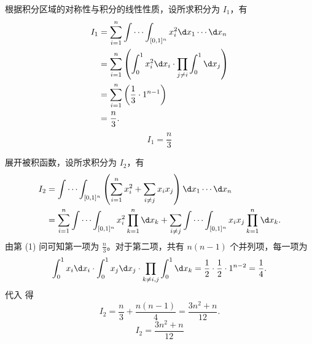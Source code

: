 \begin{solution}

    根据积分区域的对称性与积分的线性性质，设所求积分为 $I_1$，有
    \begin{equation}
        \begin{aligned}
            I_1 & = \sum_{i=1}^{n} \int \cdots \int_{[0,1]^n} x_i^2 \d x_1 \cdots \d x_n                       \\
                & = \sum_{i=1}^{n} \left( \int_0^1 x_i^2 \d x_i \cdot \prod_{j \neq i} \int_0^1 \d x_j \right) \\
                & = \sum_{i=1}^{n} \left( \frac{1}{3} \cdot 1^{n-1} \right)                                    \\
                & = \frac{n}{3}.
        \end{aligned}
    \end{equation}
    \begin{equation}
        \boxed{I_1 = \frac{n}{3}}
    \end{equation}


    展开被积函数，设所求积分为 $I_2$，有
    \begin{equation}
        \begin{aligned}
            I_2 & = \int \cdots \int_{[0,1]^n} \left( \sum_{i=1}^n x_i^2 + \sum_{i \neq j} x_i x_j \right) \d x_1 \cdots \d x_n                                   \\
                & = \sum_{i=1}^n \int \cdots \int_{[0,1]^n} x_i^2 \prod_{k=1}^n \d x_k + \sum_{i \neq j} \int \cdots \int_{[0,1]^n} x_i x_j \prod_{k=1}^n \d x_k.
        \end{aligned} \label{eq:expansion-2}
    \end{equation}
    由第 (1) 问可知第一项为 $\frac{n}{3}$。对于第二项，共有 $n(n-1)$ 个并列项，每一项为
    \begin{equation}
        \int_0^1 x_i \d x_i \cdot \int_0^1 x_j \d x_j \cdot \prod_{k \neq i,j} \int_0^1 \d x_k = \frac{1}{2} \cdot \frac{1}{2} \cdot 1^{n-2} = \frac{1}{4}.
    \end{equation}
    代入  得
    \begin{equation}
        I_2 = \frac{n}{3} + \frac{n(n-1)}{4} = \frac{3n^2 + n}{12}.
    \end{equation}
    \begin{equation}
        \boxed{I_2 = \frac{3n^2 + n}{12}}
    \end{equation}


\end{solution}
